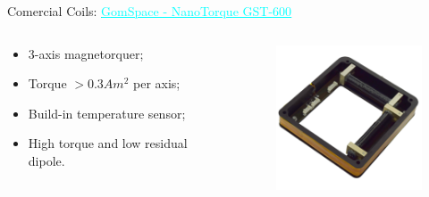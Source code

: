 \begin{frame}{Comercial Coils: \href{https://gomspace.com/shop/subsystems/attitude-orbit-control-systems/nanotorque-gst-600.aspx}{\textcolor{cyan}{\underline{GomSpace - NanoTorque GST-600}}}}

    \begin{columns}[t]
        \begin{column}[t]{0.5\textwidth}
            \begin{itemize}
                \item 3-axis magnetorquer;
                \item Torque $>0.3 Am^2$ per axis;
                \item Build-in temperature sensor;
                \item High torque and low residual dipole.
            \end{itemize}
        \end{column}
        \begin{column}[t]{0.5\textwidth}
            \begin{figure}[!ht]
                \begin{center}
                    \includegraphics[width=4.5cm]{figures/magnetorquers-gomspace.png}
                \end{center}
            \end{figure}
        \end{column}
    \end{columns}
    
\end{frame}


